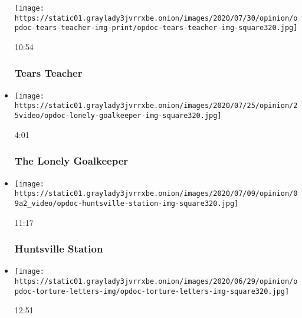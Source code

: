 \begin{itemize}
  \texttt{[image: https://static01.graylady3jvrrxbe.onion/images/2020/07/30/opinion/opdoc-tears-teacher-img-print/opdoc-tears-teacher-img-square320.jpg]}

  10:54

  \hypertarget{tears-teacher}{%
  \subsubsection{Tears Teacher}\label{tears-teacher}}
\item
  \href{https://www.nytimes3xbfgragh.onion/video/opinion/100000007229285/the-lonely-goalkeeper.html?action=click\&module=video-series-bar\&region=header\&pgtype=Article\&playlistId=video/op-docs}{}

  \texttt{[image: https://static01.graylady3jvrrxbe.onion/images/2020/07/25/opinion/25video/opdoc-lonely-goalkeeper-img-square320.jpg]}

  4:01

  \hypertarget{the-lonely-goalkeeper}{%
  \subsubsection{The Lonely Goalkeeper}\label{the-lonely-goalkeeper}}
\item
  \href{https://www.nytimes3xbfgragh.onion/video/opinion/100000007080462/huntsville-station.html?action=click\&module=video-series-bar\&region=header\&pgtype=Article\&playlistId=video/op-docs}{}

  \texttt{[image: https://static01.graylady3jvrrxbe.onion/images/2020/07/09/opinion/09a2\_video/opdoc-huntsville-station-img-square320.jpg]}

  11:17

  \hypertarget{huntsville-station}{%
  \subsubsection{Huntsville Station}\label{huntsville-station}}
\item
  \href{https://www.nytimes3xbfgragh.onion/video/opinion/100000007205588/the-torture-letters.html?action=click\&module=video-series-bar\&region=header\&pgtype=Article\&playlistId=video/op-docs}{}

  \texttt{[image: https://static01.graylady3jvrrxbe.onion/images/2020/06/29/opinion/opdoc-torture-letters-img/opdoc-torture-letters-img-square320.jpg]}

  12:51

  \hypertarget{the-torture-letters}{%
}
\end{itemize}
